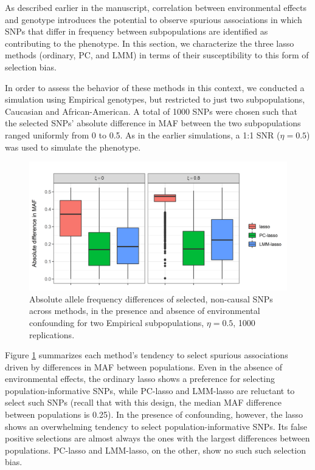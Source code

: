 As described earlier in the manuscript, correlation between environmental effects and genotype introduces the potential to observe spurious associations in which SNPs that differ in frequency between subpopulations are identified as contributing to the phenotype.  In this section, we characterize the three lasso methods (ordinary, PC, and LMM) in terms of their susceptibility to this form of selection bias.

In order to assess the behavior of these methods in this context, we conducted a simulation using Empirical genotypes, but restricted to just two subpopulations, Caucasian and African-American.  A total of 1000 SNPs were chosen such that the selected SNPs' absolute difference in MAF between the two subpopulations ranged uniformly from 0 to 0.5. As in the earlier simulations, a 1:1 SNR ($\eta = 0.5$) was used to simulate the phenotype.

\begin{figure}[H]
\centering
\includegraphics[scale = 0.9]{figures/figure_02.png}
\caption{Absolute allele frequency differences of selected, non-causal SNPs across methods, in the presence and absence of environmental confounding for two Empirical subpopulations, $\eta = 0.5$, 1000 replications.}
\label{fig:pop_inf}
\end{figure}

Figure \ref{fig:pop_inf} summarizes each method's tendency to select spurious associations driven by differences in MAF between populations.  Even in the absence of environmental effects, the ordinary lasso shows a preference for selecting population-informative SNPs, while PC-lasso and LMM-lasso are reluctant to select such SNPs (recall that with this design, the median MAF difference between populations is 0.25).  In the presence of confounding, however, the lasso shows an overwhelming tendency to select population-informative SNPs.  Its false positive selections are almost always the ones with the largest differences between populations.  PC-lasso and LMM-lasso, on the other, show no such such selection bias.


